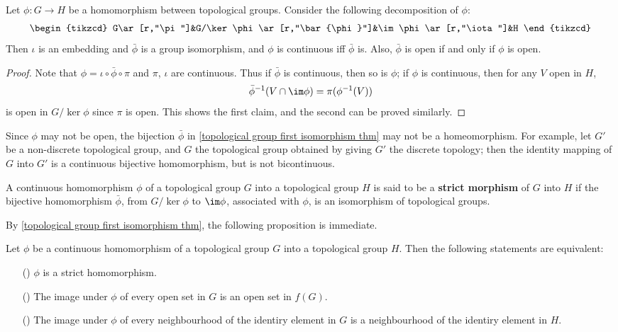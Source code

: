 \begin{proposition}\label{topological group first isomorphism thm}
Let $\phi:G\to H$ be a homomorphism between topological groups. Consider the following decomposition of $\phi$:
\[\begin{tikzcd}
G\ar[r,"\pi"]&G/\ker\phi\ar[r,"\bar{\phi}"]&\im\phi\ar[r,"\iota"]&H
\end{tikzcd}\]
Then $\iota$ is an embedding and $\bar{\phi}$ is a group isomorphism, and $\phi$ is continuous iff $\bar{\phi}$ is. Also, $\bar{\phi}$ is open if and only if $\phi$ is open.
\end{proposition}
\begin{proof}
Note that $\phi=\iota\circ\bar{\phi}\circ\pi$ and $\pi$, $\iota$ are continuous. Thus if $\bar{\phi}$ is continuous, then so is $\phi$; if $\phi$ is continuous, then for any $V$ open in $H$,
\[\bar{\phi}^{-1}(V\cap\im\phi)=\pi(\phi^{-1}(V))\]
is open in $G/\ker\phi$ since $\pi$ is open. This shows the first claim, and the second can be proved similarly.
\end{proof}
Since $\phi$ may not be open, the bijection $\bar{\phi}$ in \cref{topological group first isomorphism thm} may not be a homeomorphism. For example, let $G'$ be a non-discrete topological group, and $G$ the topological group obtained by giving $G'$ the discrete topology; then the identity mapping of $G$ into $G'$ is a continuous bijective homomorphism, but is not bicontinuous.
\begin{definition}
A continuous homomorphism $\phi$ of a topological group $G$ into a topological group $H$ is said to be a \textbf{strict morphism} of $G$ into $H$ if the bijective homomorphism $\bar{\phi}$, from $G/\ker\phi$ to $\im\phi$, associated with $\phi$, is an isomorphism of topological groups.
\end{definition}
By \cref{topological group first isomorphism thm}, the following proposition is immediate.
\begin{proposition}\label{topological group stric morphism iff}
Let $\phi$ be a continuous homomorphism of a topological group $G$ into a topological group $H$. Then the following statements are equivalent:
\begin{itemize}
\item[(\rmnum{1})] $\phi$ is a strict homomorphism. 
\item[(\rmnum{2})] The image under $\phi$ of every open set in $G$ is an open set in $f(G)$.
\item[(\rmnum{3})] The image under $\phi$ of every neighbourhood of the identiry element in $G$ is a neighbourhood of the identiry element in $H$.  
\end{itemize}
\end{proposition}
